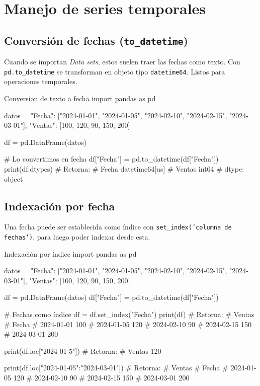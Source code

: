 \section{Manejo de series temporales}

\subsection{Conversión de fechas (\texttt{to\_datetime})}

Cuando se importan \textit{Data sets}, estos suelen traer las fechas como texto. Con \texttt{pd.to\_datetime} se transforman en objeto tipo \texttt{datetime64}. Listos para operaciones temporales.

\begin{pycode}{Conversion de texto a fecha}
import pandas as pd

datos = {
    "Fecha": ["2024-01-01", "2024-01-05", "2024-02-10", "2024-02-15", "2024-03-01"],
    "Ventas": [100, 120, 90, 150, 200]
}

df = pd.DataFrame(datos)

# Lo convertimos en fecha
df["Fecha"] = pd.to_datetime(df["Fecha"])
print(df.dtypes) # Retorna:
# Fecha     datetime64[us]
# Ventas             int64
# dtype: object
\end{pycode}



\subsection{Indexación por fecha}

Una fecha puede ser establecida como índice con \texttt{set\_index('columna de fechas')}, para luego poder indexar desde esta.

\begin{pycode}{Indexación por índice}
import pandas as pd

datos = {
    "Fecha": ["2024-01-01", "2024-01-05", "2024-02-10", "2024-02-15", "2024-03-01"],
    "Ventas": [100, 120, 90, 150, 200]
}

df = pd.DataFrame(datos)
df["Fecha"] = pd.to_datetime(df["Fecha"])

# Fechas como índice
df = df.set_index("Fecha")
print(df) # Retorna:
#             Ventas
# Fecha             
# 2024-01-01     100
# 2024-01-05     120
# 2024-02-10      90
# 2024-02-15     150
# 2024-03-01     200

print(df.loc["2024-01-5"]) # Retorna:
# Ventas    120

print(df.loc["2024-01-05":"2024-03-01"]) # Retorna:
#             Ventas
# Fecha             
# 2024-01-05     120
# 2024-02-10      90
# 2024-02-15     150
# 2024-03-01     200    
\end{pycode}

